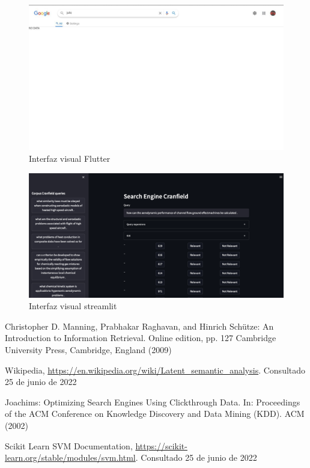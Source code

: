 \documentclass[runningheads]{llncs}
\begin{document}
\begin{figure}
\includegraphics[width=\textwidth]{ui.jpg}
\caption{Interfaz visual Flutter} \label{ui_fig}
\end{figure}
    
\begin{figure}
    \includegraphics[width=\textwidth]{ui_streamlit.png}
    \caption{Interfaz visual streamlit} \label{ui_streamlit_fig}
\end{figure}

\newpage
        
\begin{thebibliography}{8}

Christopher D. Manning, Prabhakar Raghavan, and Hinrich Schütze:
An Introduction to Information Retrieval. Online edition, pp. 127 Cambridge University Press,
Cambridge, England (2009)

Wikipedia, \url{https://en.wikipedia.org/wiki/Latent\_semantic\_analysis}. Consultado 25 de junio de 2022

Joachims: Optimizing Search Engines Using Clickthrough Data. In: Proceedings of the ACM Conference 
on Knowledge Discovery and Data Mining (KDD). ACM (2002)

Scikit Learn SVM Documentation, \url{https://scikit-learn.org/stable/modules/svm.html}. Consultado 25 de junio de 2022

\end{thebibliography}
\end{document}
